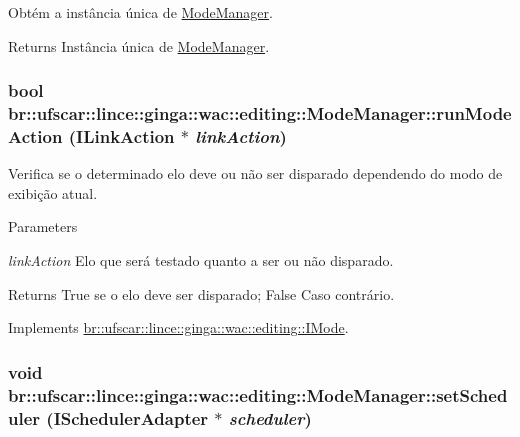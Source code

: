 Obtém a instância única de \hyperlink{classbr_1_1ufscar_1_1lince_1_1ginga_1_1wac_1_1editing_1_1ModeManager}{ModeManager}. 

\begin{DoxyReturn}{Returns}
Instância única de \hyperlink{classbr_1_1ufscar_1_1lince_1_1ginga_1_1wac_1_1editing_1_1ModeManager}{ModeManager}. 
\end{DoxyReturn}
\hypertarget{classbr_1_1ufscar_1_1lince_1_1ginga_1_1wac_1_1editing_1_1ModeManager_a5456384c5ce5e3d7114429e5e28273b8}{
\subsubsection[{runModeAction}]{\setlength{\rightskip}{0pt plus 5cm}bool br::ufscar::lince::ginga::wac::editing::ModeManager::runModeAction ({\bf ILinkAction} $\ast$ {\em linkAction})}}
\label{classbr_1_1ufscar_1_1lince_1_1ginga_1_1wac_1_1editing_1_1ModeManager_a5456384c5ce5e3d7114429e5e28273b8}


Verifica se o determinado elo deve ou não ser disparado dependendo do modo de exibição atual. 


\begin{DoxyParams}{Parameters}
\item[{\em linkAction}]Elo que será testado quanto a ser ou não disparado. \end{DoxyParams}
\begin{DoxyReturn}{Returns}
True se o elo deve ser disparado; False Caso contrário. 
\end{DoxyReturn}


Implements \hyperlink{classbr_1_1ufscar_1_1lince_1_1ginga_1_1wac_1_1editing_1_1IMode_a5c0f479717a32e10c4810abdfe4e03d4}{br::ufscar::lince::ginga::wac::editing::IMode}.

\hypertarget{classbr_1_1ufscar_1_1lince_1_1ginga_1_1wac_1_1editing_1_1ModeManager_ac73004e6c04b17ce1673e1fc2a179561}{
\subsubsection[{setScheduler}]{\setlength{\rightskip}{0pt plus 5cm}void br::ufscar::lince::ginga::wac::editing::ModeManager::setScheduler ({\bf ISchedulerAdapter} $\ast$ {\em scheduler})}}
\label{classbr_1_1ufscar_1_1lince_1_1ginga_1_1wac_1_1editing_1_1ModeManager_ac73004e6c04b17ce1673e1fc2a179561}


